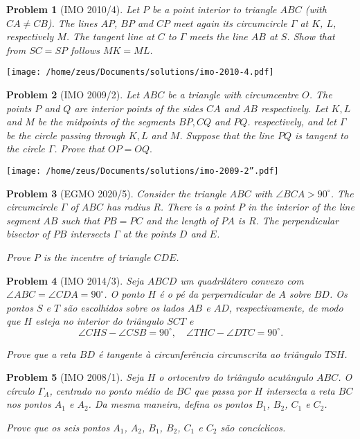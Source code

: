 \documentclass[12pt]{article}
\newtheorem{prob}{Problem}
\begin{document}
\begin{prob}[IMO 2010/4]
Let $P$ be a point interior to triangle $ABC$ (with $CA \neq CB$).
The lines $AP$, $BP$ and $CP$ meet again its circumcircle $\Gamma$ at $K$, $L$, respectively $M$.
The tangent line at $C$ to $\Gamma$ meets the line $AB$ at $S$.
Show that from $SC = SP$ follows $MK = ML$.
\end{prob}

\texttt{[image: /home/zeus/Documents/solutions/imo-2010-4.pdf]}

\newpage

\begin{prob}[IMO 2009/2]
Let $ ABC$ be a triangle with circumcentre $ O$. The points $ P$ and $ Q$ are interior points of the sides $ CA$ and $ AB$ respectively. Let $ K,L$ and $ M$ be the midpoints of the segments $ BP,CQ$ and $ PQ$. respectively, and let $ \Gamma$ be the circle passing through $ K,L$ and $ M$. Suppose that the line $ PQ$ is tangent to the circle $ \Gamma$. Prove that $ OP = OQ.$
\end{prob}

\texttt{[image: /home/zeus/Documents/solutions/imo-2009-2''.pdf]}

\newpage


\begin{prob}[EGMO 2020/5]
Consider the triangle $ABC$ with $\angle BCA > 90^{\circ}$. The circumcircle $\Gamma$ of $ABC$ has radius $R$. There is a point $P$ in the interior of the line segment $AB$ such that $PB = PC$ and the length of $PA$ is $R$. The perpendicular bisector of $PB$ intersects $\Gamma$ at the points $D$ and $E$.

Prove $P$ is the incentre of triangle $CDE$.
\end{prob}

\newpage

\begin{prob}[IMO 2014/3]
Seja $ABCD$ um quadrilátero convexo com $\angle ABC = \angle CDA = 90^{\circ}$. O ponto $H$ é o pé da perperndicular de $A$ sobre $BD$. Os pontos $S$ e $T$ são escolhidos sobre os lados $AB$ e $AD$, respectivamente, de modo que $H$ esteja no interior do triângulo $SCT$ e \[ \angle CHS - \angle CSB = 90^{\circ}, \quad \angle THC - \angle DTC = 90^{\circ}. \]

Prove que a reta $BD$ é tangente à circunferência circunscrita ao triângulo $TSH$.
\end{prob}

\newpage

\begin{prob}[IMO 2008/1]
Seja $H$ o ortocentro do triângulo acutângulo $ABC$. O círculo $\Gamma_{A}$, centrado no ponto médio de $BC$ que passa por $H$ intersecta a reta $BC$ nos pontos $A_{1}$ e $A_{2}$. Da mesma maneira, defina os pontos $B_{1}$, $B_{2}$, $C_{1}$ e $C_{2}$.

Prove que os seis pontos $A_{1}$, $ A_{2}$, $ B_{1}$, $ B_{2}$, $ C_{1}$ e $ C_{2}$ são concíclicos.
\end{prob}
\end{document}
